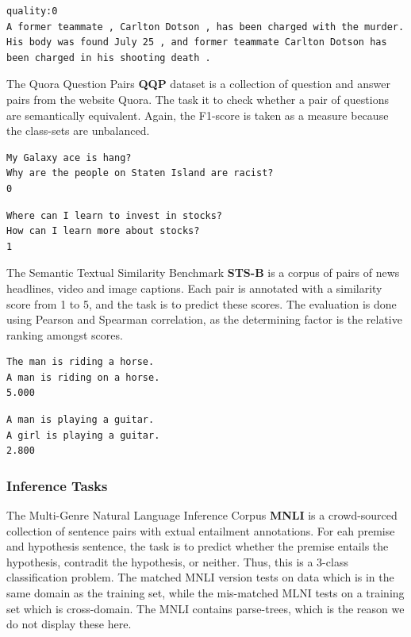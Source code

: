 \documentclass[a4paper,12pt,twoside,openright]{report}
\begin{document}
\begin{verbatim}
quality:0	
A former teammate , Carlton Dotson , has been charged with the murder.	
His body was found July 25 , and former teammate Carlton Dotson has been charged in his shooting death .
\end{verbatim}

The Quora Question Pairs \textbf{QQP} dataset is a collection of question and answer pairs from the website Quora. 
The task it to check whether a pair of questions are semantically equivalent.
Again, the F1-score is taken as a measure because the class-sets are unbalanced.


\begin{verbatim}
My Galaxy ace is hang?	
Why are the people on Staten Island are racist?	
0
\end{verbatim}

\begin{verbatim}
Where can I learn to invest in stocks?	
How can I learn more about stocks?	
1
\end{verbatim}

The Semantic Textual Similarity Benchmark \textbf{STS-B} is a corpus of pairs of news headlines, video and image captions.
Each pair is annotated with a similarity score from 1 to 5, and the task is to predict these scores.
The evaluation is done using Pearson and Spearman correlation, as the determining factor is the relative ranking amongst scores.


\begin{verbatim}
The man is riding a horse.	
A man is riding on a horse.	
5.000
\end{verbatim}

\begin{verbatim}
A man is playing a guitar.
A girl is playing a guitar.	
2.800
\end{verbatim}

\subsubsection{Inference Tasks}

The Multi-Genre Natural Language Inference Corpus \textbf{MNLI} is a crowd-sourced collection of sentence pairs with extual entailment annotations.
For eah premise and hypothesis sentence, the task is to predict whether the premise entails the hypothesis, contradit the hypothesis, or neither.
Thus, this is a 3-class classification problem.
The matched MNLI version tests on data which is in the same domain as the training set, while the mis-matched MLNI tests on a training set which is cross-domain.
The MNLI contains parse-trees, which is the reason we do not display these here.
\end{document}
